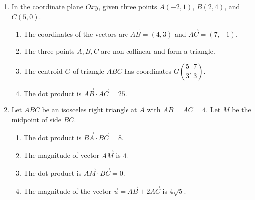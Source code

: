 \documentclass[10pt,a4paper]{article}
\begin{document}
\begin{enumerate}
\item In the coordinate plane $Oxy$, given three points $A(-2, 1)$, $B(2, 4)$, and $C(5, 0)$.
\begin{enumerate}
    \item The coordinates of the vectors are $\vec{AB} = (4, 3)$ and $\vec{AC} = (7, -1)$.
    \item The three points $A, B, C$ are non-collinear and form a triangle.
    \item The centroid $G$ of triangle $ABC$ has coordinates $G\left(\dfrac{5}{3}, \dfrac{7}{3}\right)$.
    \item The dot product is $\vec{AB} \cdot \vec{AC} = 25$.
\end{enumerate}

\item Let $ABC$ be an isosceles right triangle at $A$ with $AB = AC = 4$. Let $M$ be the midpoint of side $BC$.
\begin{enumerate}
    \item The dot product is $\vec{BA} \cdot \vec{BC} = 8$.
    \item The magnitude of vector $\vec{AM}$ is $4$.
    \item The dot product is $\vec{AM} \cdot \vec{BC} = 0$.
    \item The magnitude of the vector $\vec{u} = \vec{AB} + 2\vec{AC}$ is $4\sqrt{5}$.
\end{enumerate}
\end{enumerate}
\end{document}
